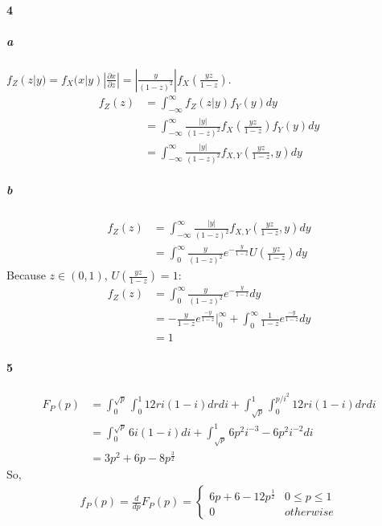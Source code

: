 \documentclass[22pt]{article}
\begin{document}
	\paragraph{4}
		\subparagraph{a}
		$f_Z(z|y) = f_X(x|y)|\frac{\partial x}{\partial z}| = |\frac{y}{(1-z)^2}|f_X(\frac{yz}{1-z} )$.
		\begin{align}
		f_Z(z) & = \int_{-\infty}^{\infty}f_Z(z|y)f_Y(y)dy\\
		& = \int_{-\infty}^{\infty}\frac{|y|}{(1-z)^2}f_X(\frac{yz}{1-z} )f_Y(y)dy\\
		& = \int_{-\infty}^{\infty}\frac{|y|}{(1-z)^2}f_{X,Y}(\frac{yz}{1-z},y)dy
		\end{align}

		\subparagraph{b}
		\begin{align}
		f_Z(z) & = \int_{-\infty}^{\infty}\frac{|y|}{(1-z)^2}f_{X,Y}(\frac{yz}{1-z},y)dy\\
		& = \int_{0}^{\infty}\frac{y}{(1-z)^2}e^{-\frac{y}{1-z}}U(\frac{yz}{1-z}) dy
		\end{align}
		Because $z \in(0,1)$, $U(\frac{yz}{1-z}) = 1$:
		\begin{align}
		f_Z(z) & =\int_{0}^{\infty}\frac{y}{(1-z)^2}e^{-\frac{y}{1-z}}dy\\
		& =  -\frac{y}{1-z}e^{\frac{-y}{1-z}}|^\infty_0+\int_{0}^{\infty}\frac{1}{1-z}e^{\frac{-y}{1-z}}dy\\
		& = 1
		\end{align}

	\paragraph{5}
		\begin{align}
		F_P(p) & = \int_{0}^{\sqrt{p}}\int_{0}^{1} 12ri(1-i) drdi + \int_{\sqrt{p}}^{1}\int_{0}^{p/i^2} 12ri(1-i)drdi\\
		& = \int_{0}^{\sqrt{p}} 6i(1-i) di + \int_{\sqrt{p}}^{1} 6p^2i^{-3} -6p^2i^{-2} di\\
		& = 3p^2+6p-8p^{\frac{3}{2}}
		\end{align}
		So, \begin{align}
			f_P(p) = \frac{d}{dp}F_P(p) =
					\begin{cases}
					6p+6-12p^{\frac{1}{2}} & 0\leq p \leq 1\\
					0 & otherwise
					\end{cases}
		\end{align}
\end{document}
